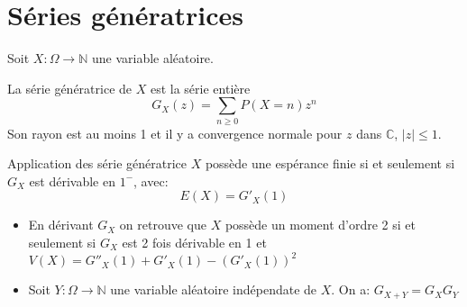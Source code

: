 \documentclass[french, a4paper, 10pt, twocolumn]{article}
\newcommand{\N}{\mathbb{N}}   %
\newcommand{\C}{\mathbb{C}}   %
\begin{document}
\section{Séries génératrices}

\begin{definition}
  Soit \(X: \Omega \rightarrow \N\) une variable aléatoire.

  La série génératrice de \(X\) est la série entière
  \[G_X(z)=\sum_{n\geqslant 0}P(X=n)z^n\]
  Son rayon est au moins 1 et il y a convergence normale pour \(z\) dans \(\C\), \(\lvert z \rvert \leqslant 1\).
\end{definition}

\begin{theoreme}{Application des série génératrice}
  \(X\) possède une espérance finie si et seulement si \(G_X\) est dérivable en \(1^-\), avec:
  \[E(X)=G'_X(1)\]
  \tcblower
  \begin{itemize}
    \item En dérivant \(G_X\) on retrouve que \(X\) possède un moment d'ordre 2 si et seulement si \(G_X\) est
      2 fois dérivable en 1 et \(V(X)=G''_X(1)+G'_X(1)-(G'_X(1))^2\)
    \item Soit \(Y: \Omega \rightarrow \N\) une variable aléatoire indépendate de \(X\). On a: \(G_{X+Y}=G_X G_Y\)
  \end{itemize}
\end{theoreme}
\end{document}
